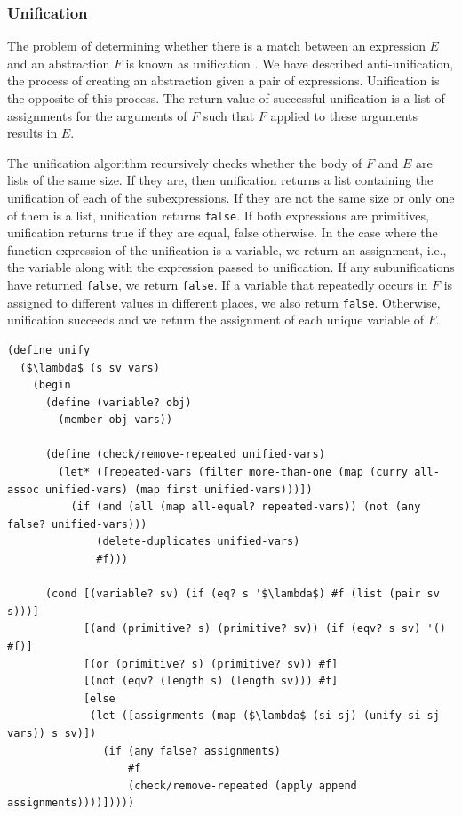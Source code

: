 \documentclass[a4paper,10pt]{article}
\begin{document}


\subsubsection{Unification}

The problem of determining whether there is a match between an expression $E$ and an abstraction $F$ is known as unification \cite{Robinson:1965:MLB:321250.321253}. We have described anti-unification, the process of creating an abstraction given a pair of expressions. Unification is the opposite of this process.  The return value of successful unification is a list of assignments for the arguments of $F$ such that $F$ applied to these arguments results in $E$.

The unification algorithm recursively checks whether the body of $F$ and $E$ are lists of the same size.  If they are, then unification returns a list containing the unification of each of the subexpressions.  If they are not the same size or only one of them is a list, unification returns \texttt{false}.  If both expressions are primitives, unification returns true if they are equal, false otherwise.  In the case where the function expression of the unification is a variable, we return an assignment, i.e., the variable along with the expression passed to unification. If any subunifications have returned \texttt{false}, we return \texttt{false}. If a variable that repeatedly occurs in $F$ is assigned to different values in different places, we also return \texttt{false}.
Otherwise, unification succeeds and we return the assignment of each unique variable of $F$.

\begin{lstlisting}[frame=trbl]
(define unify
  ($\lambda$ (s sv vars)
    (begin
      (define (variable? obj)
        (member obj vars))

      (define (check/remove-repeated unified-vars)
        (let* ([repeated-vars (filter more-than-one (map (curry all-assoc unified-vars) (map first unified-vars)))])
          (if (and (all (map all-equal? repeated-vars)) (not (any false? unified-vars)))
              (delete-duplicates unified-vars)
              #f)))
      
      (cond [(variable? sv) (if (eq? s '$\lambda$) #f (list (pair sv s)))]
            [(and (primitive? s) (primitive? sv)) (if (eqv? s sv) '() #f)]
            [(or (primitive? s) (primitive? sv)) #f]
            [(not (eqv? (length s) (length sv))) #f]
            [else
             (let ([assignments (map ($\lambda$ (si sj) (unify si sj vars)) s sv)])
               (if (any false? assignments)
                   #f
                   (check/remove-repeated (apply append assignments))))]))))
\end{lstlisting}
\end{document}
